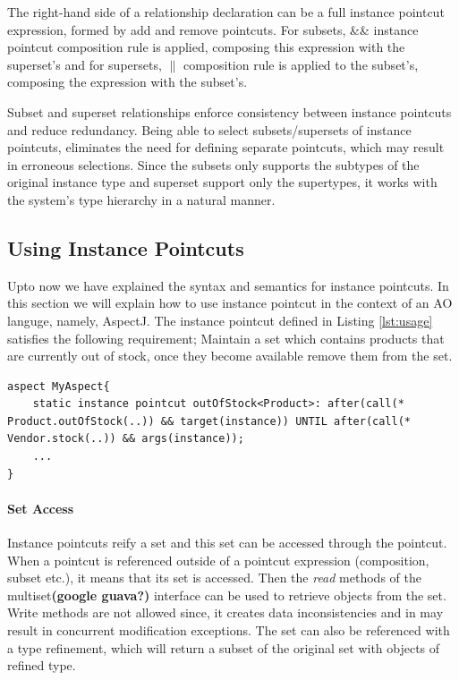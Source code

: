 \documentclass{llncs}
\begin{document}
The right-hand side of a relationship declaration can be a full instance pointcut expression, formed by add and remove pointcuts. For subsets, \&\& instance pointcut composition rule is applied, composing this expression with the superset's and for supersets, $\|$ composition rule is applied to the subset's, composing the expression with the subset's. 

Subset and superset relationships enforce consistency between instance pointcuts and reduce redundancy. Being able to select subsets/supersets of instance pointcuts, eliminates the need for defining separate pointcuts, which may result in erroneous selections. Since the subsets only supports the subtypes of the original instance type and superset support only the supertypes, it works with the system's type hierarchy in a natural manner. 


\subsection{Using Instance Pointcuts}
Upto now we have explained the syntax and semantics for instance pointcuts. In this section we will explain how to use instance pointcut in the context of an AO languge, namely, AspectJ. The instance pointcut defined in Listing \ref{lst:usage} satisfies the following requirement; \textsf{Maintain a set which contains products that are currently out of stock, once they become available remove them from the set}.

\begin{lstlisting}[float=h!, caption={An instance pointcut for out of stock products}, label={lst:usage}]
aspect MyAspect{
	static instance pointcut outOfStock<Product>: after(call(* Product.outOfStock(..)) && target(instance)) UNTIL after(call(* Vendor.stock(..)) && args(instance));
	...
}
\end{lstlisting}

\paragraph{Set Access}
Instance pointcuts reify a set and this set can be accessed through the pointcut. When a pointcut is referenced outside of a pointcut expression (composition, subset etc.), it means that its set is accessed. Then the \emph{read} methods of the multiset\textbf{(google guava?)} interface can be used to retrieve objects from the set. Write methods are not allowed since, it creates data inconsistencies and in may result in concurrent modification exceptions. The set can also be referenced with a type refinement, which will return a subset of the original set with objects of refined type. 
\end{document}
